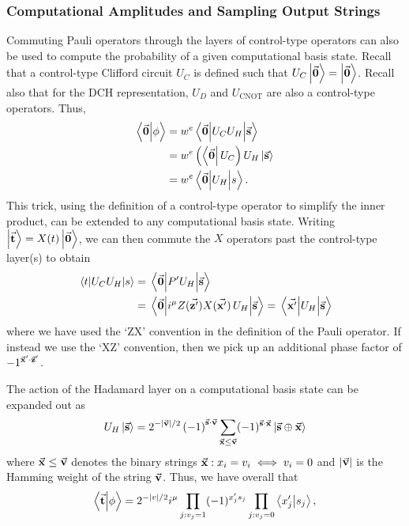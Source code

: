 \subsubsection*{Computational Amplitudes and Sampling Output Strings}
Commuting Pauli operators through the layers of control-type operators can also be used to compute the probability of a given computational basis state. Recall that a control-type Clifford circuit $U_{C}$ is defined such that $U_{C}\ket{\va{0}}=\ket{\va{0}}$. Recall also that for the DCH representation, $U_{D}$ and $U_{\text{CNOT}}$ are also a control-type operators. Thus,
\begin{align*}
\braket{\va{0}}{\phi} &= w^{e}\matrixel{\va{0}}{U_{C}U_{H}}{\va{s}} \nonumber \\
&= w^{e}\left(\bra{\va{0}}U_{C}\right)U_{H}\ket{\va{s}} \nonumber \\
&= w^{e}\matrixel{\va{0}}{U_{H}}{s}.
\end{align*}
This trick, using the definition of a control-type operator to simplify the inner product, can be extended to any computational basis state. Writing $\ket{\va{t}}=X(t)\ket{\va{0}}$, we can then commute the $X$ operators past the control-type layer(s) to obtain
\begin{align}
\matrixel{t}{U_{C}U_{H}}{s} &= \matrixel{\va{0}}{P'U_{H}}{\va{s}} \nonumber \\
&= \matrixel{\va{0}}{i^{\mu}Z(\va{z'})X(\va{x'})\,U_{H}}{\va{s}} = \matrixel{\va{x'}}{U_{H}}{\va{s}}
\label{eq:arbitray_computational}
\end{align}
where we have used the `ZX' convention in the definition of the Pauli operator. If instead we use the `XZ' convention, then we pick up an additional phase factor of $-1^{\va{x}'\cdot \va{z}'}$.\par
The action of the Hadamard layer on a computational basis state can be expanded out as
\begin{equation}
U_{H}\ket{\va{s}}=2^{-\left\vert \va{v}\right\vert/2}\left(-1\right)^{\va{s}\cdot \va{v}}\sum_{\va{x}\leq \va{v}}(-1)^{\va{s}\cdot \va{x}}\ket{\va{s} \oplus \va{x}}
\label{eq:hadamard_action}
\end{equation}
where $\va{x}\leq \va{v}$ denotes the binary strings $\va{x}:x_{i}=v_{i}\iff v_{i}=0$ and $\left\vert \va{v}\right\vert$ is the Hamming weight of the string $\va{v}$. Thus, we have overall that
\begin{equation}
\braket{\va{t}}{\phi} = 2^{-\left\vert{v}\right\vert /2}i^{\mu}\prod_{j:v_{j}=1}(-1)^{x'_{j}s_{j}}\prod_{j:v_{j}=0}\braket{x'_{j}}{s_{j}},
\end{equation}
